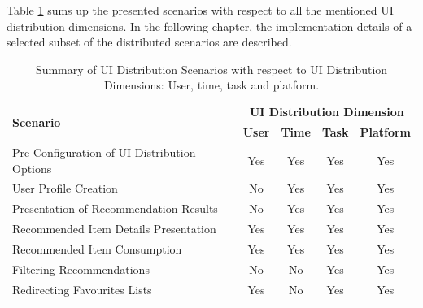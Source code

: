 Table \ref{tab:table31} sums up the presented scenarios with respect to all the
mentioned UI distribution dimensions. In the following chapter, the implementation details of a selected subset of the distributed scenarios are described.
\begin{table}[position specifier]
  \centering
  \begin{tabular}{ |l|c|c|c|c| }
  \hline
  \multirow{2}{*}{\textbf{Scenario}} &\multicolumn{4}{c|}{\textbf{UI Distribution Dimension}} \\
  \cline{2-5}
   & \textbf{User} & \textbf{Time} & \textbf{Task} & \textbf{Platform} \\
   \hline
   Pre-Configuration of UI Distribution Options & Yes & Yes & Yes & Yes \\
   \hline
   User Profile Creation & No & Yes & Yes & Yes \\
   \hline
   Presentation of Recommendation Results & No & Yes & Yes & Yes \\
   \hline
   Recommended Item Details Presentation & Yes & Yes & Yes & Yes \\
   \hline
   Recommended Item Consumption & Yes & Yes & Yes & Yes \\
   \hline
   Filtering Recommendations & No & No & Yes & Yes \\
   \hline
   Redirecting Favourites Lists & Yes & No & Yes & Yes \\
   \hline
   \end{tabular}
   \caption{Summary of UI Distribution Scenarios with respect to UI Distribution Dimensions: User, time, task and platform.}
   \label{tab:table31}  
\end{table}

  



